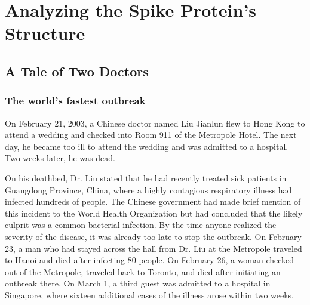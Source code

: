 \chapter[Analyzing the Spike Protein's Structure]{Analyzing the Spike Protein's Structure}
\label{chapter:coronavirus}
\renewcommand{\chaptertitle}{Analyzing the Spike Protein's Structure}

\FloatBarrier

%

\section{A Tale of Two Doctors}
\label{sec:coronavirus_introduction}

\FloatBarrier
{}
\subsection{The world's fastest outbreak}

On February 21, 2003, a Chinese doctor named Liu Jianlun flew to Hong Kong to attend a wedding and checked into Room 911 of the Metropole Hotel. The next day, he became too ill to attend the wedding and was admitted to a hospital. Two weeks later, he was dead.

On his deathbed, Dr. Liu stated that he had recently treated sick patients in Guangdong Province, China, where a highly contagious respiratory illness had infected hundreds of people. The Chinese government had made brief mention of this incident to the World Health Organization but had concluded that the likely culprit was a common bacterial infection. By the time anyone realized the severity of the disease, it was already too late to stop the outbreak. On February 23, a man who had stayed across the hall from Dr. Liu at the Metropole traveled to Hanoi and died after infecting 80 people. On February 26, a woman checked out of the Metropole, traveled back to Toronto, and died after initiating an outbreak there. On March 1, a third guest was admitted to a hospital in Singapore, where sixteen additional cases of the illness arose within two weeks.

